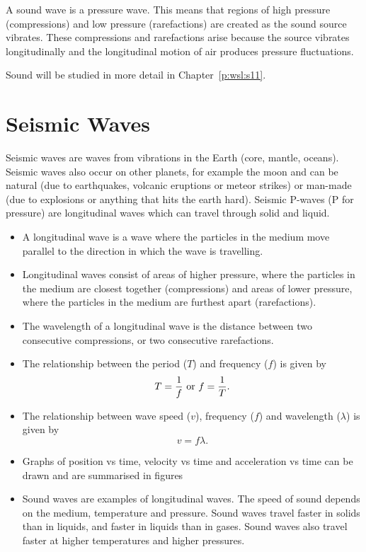 A sound wave is a pressure wave. This means that regions of high pressure (compressions) and low pressure (rarefactions) are created as the sound source vibrates. These compressions and rarefactions arise because the source vibrates longitudinally and the longitudinal motion of air produces pressure fluctuations.

Sound will be studied in more detail in Chapter~\ref{p:wsl:s11}.

\section{Seismic Waves}
Seismic waves are waves from vibrations in the Earth (core, mantle, oceans). Seismic waves also occur on other planets, for example the moon and can be natural (due to earthquakes, volcanic eruptions or meteor strikes) or man-made (due to explosions or anything that hits the earth hard). Seismic P-waves (P for pressure) are longitudinal waves which can travel through solid and liquid.

\begin{itemize}
\item A longitudinal wave is a wave where the particles in the medium move parallel to the direction in which the wave is travelling.

\item Longitudinal waves consist of areas of higher pressure, where the particles in the medium are closest together (compressions) and areas of lower pressure, where the particles in the medium are furthest apart (rarefactions).

\item The wavelength of a longitudinal wave is the distance between two consecutive compressions, or two consecutive rarefactions.

\item The relationship between the period ($T$) and frequency ($f$) is given by
$$T = \frac{1}{f} \textnormal{ or } f = \frac{1}{T}.$$

\item The relationship between wave speed ($v$), frequency ($f$) and wavelength ($\lambda$) is given by
$$v = f \lambda.$$

\item Graphs of position vs time, velocity vs time and acceleration vs time can be drawn and are summarised in figures %

\item Sound waves are examples of longitudinal waves. The speed of sound depends on the medium, temperature and pressure. Sound waves travel faster in solids than in liquids, and faster in liquids than in gases. Sound waves also travel faster at higher temperatures and higher pressures.
\end{itemize}

